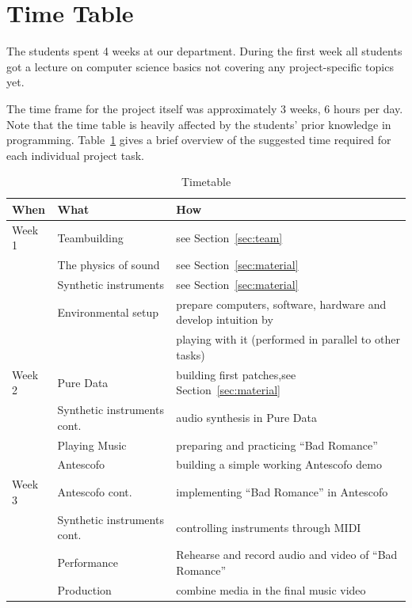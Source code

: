 \documentclass[onecolumn,nocopyrightspace,preprint]{sigplanconf}
\begin{document}
\section{Time Table}

The students spent 4 weeks at our department. During the first week all students
got a lecture on computer science basics not covering any project-specific topics yet.

The time frame for the project itself was approximately 3 weeks, 6 hours per day.
Note that the time table is heavily affected by the students' prior
knowledge in programming. Table~\ref{tab:time} gives a brief overview of the
suggested time required for each individual project task.

\begin{table}
\centering
\begin{tabular}{l|ll}
When              & What  & How  \\
\hline
Week 1            & Teambuilding          & see Section~\ref{sec:team} \\
                  & The physics of sound  & see Section~\ref{sec:material} \\
                  & Synthetic instruments & see Section~\ref{sec:material} \\
                  & Environmental setup   & prepare computers, software, hardware and develop intuition by 
                  \\
                  &  & playing with it (performed in parallel to other tasks)  \\
Week 2            & Pure Data             & building first patches,see Section~\ref{sec:material} \\
                  & Synthetic instruments cont. & audio synthesis in Pure Data \\
                  & Playing Music   & preparing and practicing ``Bad Romance'' \\
                  & Antescofo & building a simple working Antescofo demo \\
Week 3            & Antescofo cont. & implementing ``Bad Romance'' in Antescofo \\
                  & Synthetic instruments cont.  & controlling instruments through MIDI \\
                  & Performance   & Rehearse and record audio and video of ``Bad Romance'' \\
                  & Production   & combine media in the final music video \\
\end{tabular}
\caption{Timetable}
\label{tab:time}
\end{table}
\end{document}
